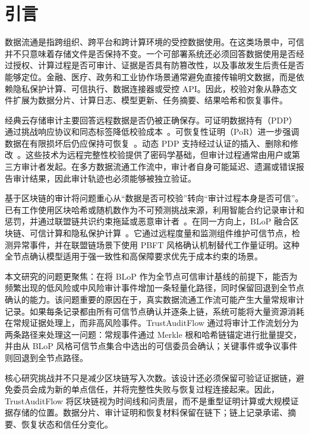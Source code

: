 \section{引言}

数据流通是指跨组织、跨平台和跨计算环境的受控数据使用。在这类场景中，可信并不只意味着存储文件是否保持不变。一个可部署系统还必须回答数据使用是否经过授权、计算过程是否可审计、证据是否具有防篡改性，以及事故发生后责任是否能够定位。金融、医疗、政务和工业协作场景通常避免直接传输明文数据，而是依赖隐私保护计算、可信执行、数据连接器或受控 API。因此，校验对象从静态文件扩展为数据分片、计算日志、模型更新、任务摘要、结果哈希和恢复事件。

经典云存储审计主要回答远程数据是否仍被正确保存。可证明数据持有（PDP）通过挑战响应协议和同态标签降低校验成本~\cite{ateniese_provable_2007}。可恢复性证明（PoR）进一步强调数据在有限损坏后仍应保持可恢复~\cite{juels_pors_2007,shacham_compact_2013}。动态 PDP 支持经过认证的插入、删除和修改~\cite{erway_dynamic_2015}。这些技术为远程完整性校验提供了密码学基础，但审计过程通常由用户或第三方审计者发起。在多方数据流通工作流中，审计者自身可能延迟、遗漏或错误报告审计结果，因此审计轨迹也必须能够被独立验证。

基于区块链的审计将问题重心从“数据是否可校验”转向“审计过程本身是否可信”。已有工作使用区块哈希或随机数作为不可预测挑战来源，利用智能合约记录审计和惩罚，并通过联盟链共识约束拖延或恶意审计者~\cite{xue_identity-based_2019,zhang_blockchain-based_2021,fan_dredas_2020,lin_consortium_2022}。在同一方向上，BLoP 融合区块链、可信计算和隐私保护计算~\cite{Zhang2025BloPAT}。它通过远程度量和监测组件维护可信节点，检测异常事件，并在联盟链场景下使用 PBFT 风格确认机制替代工作量证明。这种全节点确认模型适用于强一致性和高保障要求优先于成本约束的场景。

本文研究的问题更聚焦：在将 BLoP 作为全节点可信审计基线的前提下，能否为频繁出现的低风险或中风险审计事件增加一条轻量化路径，同时保留回退到全节点确认的能力。该问题重要的原因在于，真实数据流通工作流可能产生大量常规审计记录。如果每条记录都由所有可信节点确认并逐条上链，系统可能将大量资源消耗在常规证据处理上，而非高风险事件。TrustAuditFlow 通过将审计工作流划分为两条路径来处理这一问题：常规事件通过 Merkle 根和哈希链锚定进行批量提交，并由从 BLoP 风格可信节点集合中选出的可信委员会确认；关键事件或争议事件则回退到全节点路径。

核心研究挑战并不只是减少区块链写入次数。该设计还必须保留可验证证据链，避免委员会成为新的单点信任，并将完整性失败与恢复过程连接起来。因此，TrustAuditFlow 将区块链视为时间线和问责层，而不是重型证明计算或大规模证据存储的位置。数据分片、审计证明和恢复材料保留在链下；链上记录承诺、摘要、恢复状态和信任分变化。


